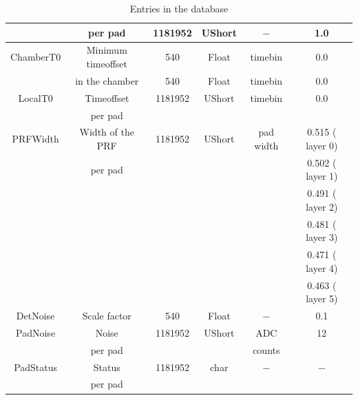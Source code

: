 \documentclass{alicetdr}
\begin{document}
\begin{table} [h]
\begin{center}
\begin{tabular}{|c|c|c|c|c|c|}
                                        &  per pad                                           & 1181952           & UShort     & $-$ & 1.0  \\ \hline
      ChamberT0                         & Minimum timeoffset                                 & 540               & Float      & timebin  & 0.0   \\
                                        & in the chamber                                        & 540               & Float      & timebin  & 0.0   \\ \hline
      LocalT0                           & Timeoffset                                         & 1181952           & UShort     & timebin & 0.0  \\
                                        & per pad                                            &                   &            &  &   \\ \hline
      PRFWidth                          & Width of the PRF                                   & 1181952           & UShort     & pad width &  0.515 ( layer 0) \\
      $ $                               & per pad                                            & $ $               & $ $        & $ $       &  0.502 ( layer 1) \\
      $ $                               & $ $                                                & $ $               & $ $        & $ $       &  0.491 ( layer 2) \\
      $ $                               & $ $                                                & $ $               & $ $        & $ $       &  0.481 ( layer 3) \\
      $ $                               & $ $                                                & $ $               & $ $        & $ $       &  0.471 ( layer 4) \\
      $ $                               & $ $                                                & $ $               & $ $        & $ $       &  0.463 ( layer 5) \\ \hline
      DetNoise                          & Scale factor                                       & 540               & Float      & $-$ & 0.1  \\ \hline
      PadNoise                          & Noise                                              & 1181952           & UShort     & ADC  & 12  \\
                                        & per pad                                            &                   &            & counts &   \\ \hline
      PadStatus                         & Status                                             & 1181952           & char       & $-$  & $-$   \\
                                        & per pad                                            &                   &            &  &   \\ \hline
    \end{tabular}
  \end{center}
\caption{\label{entriesdatabase}Entries in the database}
\end{table}
\end{document}
